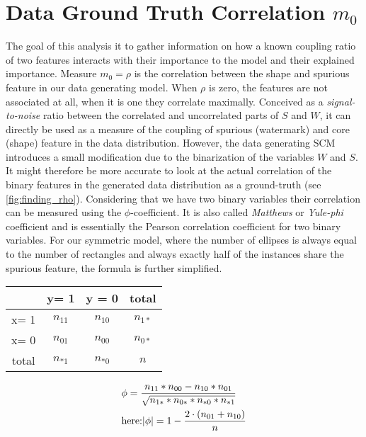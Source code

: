 \section{Data Ground Truth Correlation $m_0$}
The goal of this analysis it to gather information on how a known coupling ratio of two features interacts with their importance to the model and their explained importance. 
Measure $m_0 = \rho$ is the correlation between the shape and spurious feature in our data generating model. When $\rho$ is zero, the features are not associated at all, when it is one they correlate maximally. Conceived as a \textit{signal-to-noise} ratio between the correlated and uncorrelated parts of $S$ and $W$, it can directly be used as a measure of the coupling of spurious (watermark) and core (shape) feature in the data distribution. However, the data generating SCM introduces a small modification due to the binarization of the variables $W$ and $S$. It might therefore be more accurate to look at the actual correlation of the binary features in the generated data distribution as a ground-truth (see \cref{fig:finding_rho}). Considering that we have two binary variables their correlation can be measured using the $\phi$-coefficient. It is also called \textit{Matthews} or \textit{Yule-phi} coefficient and is essentially the Pearson correlation coefficient for two binary variables. For our symmetric model, where the number of ellipses is always equal to the number of rectangles and always exactly half of the instances share the spurious feature, the formula is further simplified.

\vspace{1em}
\begin{minipage}[t]{0.45\textwidth}
\begin{tabular}{|c|c|c|c|}
    \hline
     & y= 1 & y = 0 & total  \\  \hline
    x= 1 & $n_{11}$ & $n_{10}$ & $n_{1*}$ \\ \hline
    x= 0 & $n_{01}$ & $n_{00}$ & $n_{0*}$ \\ \hline
    total& $n_{*1}$ & $n_{*0}$ & $n$ \\ \hline
\end{tabular}
\end{minipage}%
\begin{minipage}[c]{0.45\textwidth}
\begin{align}
& \phi = \frac{n_{11} * n_{00} - n_{10}*n_{01}}{\sqrt{n_{1*}*n_{0*}*n_{*0}*n_{*1}}} \notag \\
& \text{here:} |\phi| = 1- \frac{2 \cdot (n_{01} + n_{10})}{n} 
\end{align}
\end{minipage}
\vspace{1em}


